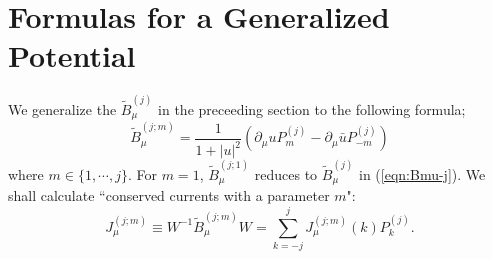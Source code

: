 \documentclass[makeidx,12pt,openany]{report}
\begin{document}
\section{Formulas for a Generalized  Potential}
We generalize the $\tilde{B}_{\mu}^{(j)}$ in the preceeding section to 
the following formula; 
\begin{equation}
 \tilde{B}_{\mu}^{(j;m)} = \frac{1}{1+|u|^2}
             (\partial_{\mu}u P_m^{(j)}-\partial_{\mu}\bar{u} P_{-m}^{(j)})
 \label{eqn:j12}
\end{equation}
where $m \in \{ 1, \cdots ,j \} $. For $m=1$, $\tilde{B}_{\mu}^{(j;1)}$ 
reduces to $\tilde{B}_{\mu}^{(j)}$ in (\ref{eqn:Bmu-j}). 
We shall calculate ``conserved currents with a parameter $m$": 
\begin{equation}
 J_{\mu}^{(j;m)} \equiv W^{-1} \tilde{B}_{\mu}^{(j;m)} W
   =\sum_{k=-j}^{j} J_{\mu}^{(j;m)}(k)P_k^{(j)}. 
\end{equation}
\end{document}
